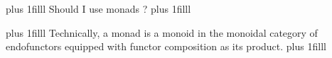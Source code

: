 \begin{frame}[plain]
    \centering
    \vskip 0pt plus 1filll
    \Huge Should I use monads ?
    \vskip 0pt plus 1filll
\end{frame}

\begin{frame}[plain]
    \centering
    \vskip 0pt plus 1filll
    \Large Technically, a monad is a monoid in the monoidal category of
    endofunctors equipped with functor composition as its product.
    \vskip 0pt plus 1filll
\end{frame}

\begin{frame}[plain]
\end{frame}

